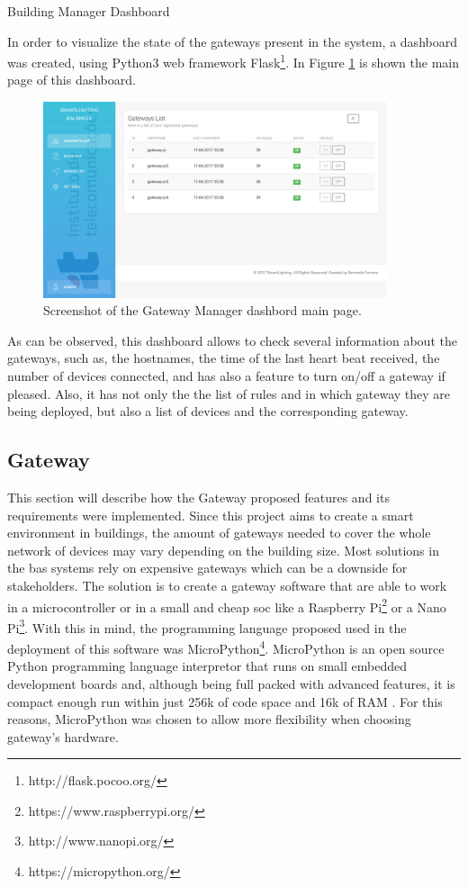 \begin{Paragraph}{Building Manager Dashboard}

In order to visualize the state of the gateways present in the system, a dashboard was created, using Python3 web framework Flask\footnote{http://flask.pocoo.org/}. In Figure \ref{fig:main_gm} is shown the main page of this dashboard.

\begin{figure}[H]
	\centering
	\includegraphics[width=0.9\textwidth]{figures/main_gm.png}
	\caption{Screenshot of the Gateway Manager dashbord main page.}
	\label{fig:main_gm}
\end{figure}

As can be observed, this dashboard allows to check several information about the gateways, such as, the hostnames, the time of the last heart beat received, the number of devices connected, and has also a feature to turn on/off a gateway if pleased. Also, it has not only the the list of rules and in which gateway they are being deployed, but also a list of devices and the corresponding gateway.


\end{Paragraph}

\subsection{Gateway}
\label{arch:gw}

This section will describe how the Gateway proposed features and its requirements were implemented. Since this project aims to create a smart environment in buildings, the amount of gateways needed to cover the whole network of devices may vary depending on the building size. Most solutions in the \ac{bas} systems rely on expensive gateways which can be a downside for stakeholders. The solution is to create a gateway software that are able to work in a microcontroller or in a small and cheap \ac{soc} like a Raspberry Pi\footnote{https://www.raspberrypi.org/} or a Nano Pi\footnote{http://www.nanopi.org/}. With this in mind, the programming language proposed used in the deployment of this software was MicroPython\footnote{https://micropython.org/}. MicroPython is an open source Python programming language interpretor that runs on small embedded development boards \cite{micro2} and, although being full packed with advanced features, it is compact enough run within just 256k of code space and 16k of RAM \cite{micro}. For this reasons, MicroPython was chosen to allow more flexibility when choosing gateway's hardware.

